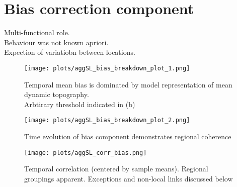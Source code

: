 \documentclass[jmse,article,submit,moreauthors,pdftex,10pt,a4paper]{mdpi}
\begin{document}
\section{Bias correction component}

Multi-functional role.\\
Behaviour was not known apriori.\\
Expection of variatiobn between locations.


\begin{figure}[H]
\centering
\texttt{[image: plots/aggSL\_bias\_breakdown\_plot\_1.png]}
\caption{ Temporal mean bias is dominated by model representation of mean dynamic topography.\\Arbtirary threshold indicated in (b)}
\end{figure}   


\begin{figure}[H]
\centering
\texttt{[image: plots/aggSL\_bias\_breakdown\_plot\_2.png]}
\caption{ Time evolution of bias component demonstrates regional coherence }
\end{figure}  


\begin{figure}[H]
\centering
\texttt{[image: plots/aggSL\_corr\_bias.png]}
\caption{ Temporal correlation (centered by sample means).   Regional groupings apparent.  Exceptions and non-local links discussed below }
\end{figure}   




\end{document}
